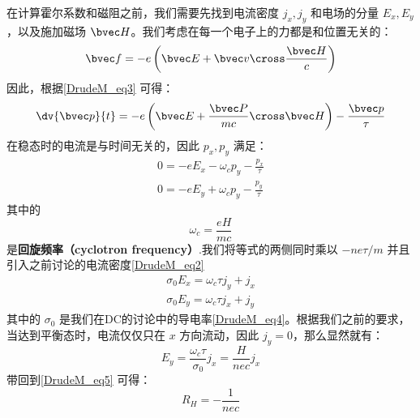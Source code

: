在计算霍尔系数和磁阻之前，我们需要先找到电流密度 $j_x,j_y$ 和电场的分量 $E_x,E_y$，以及施加磁场 $\bvec H$。我们考虑在每一个电子上的力都是和位置无关的：
\begin{equation}
\bvec f = -e\left(\bvec E +\bvec v\cross \frac{\bvec H}{c}\right)
\end{equation}
因此，根据\autoref{DrudeM_eq3} 可得：
\begin{equation}
\dv{\bvec p}{t}=-e\left(\bvec E +\frac{\bvec P}{mc}\cross \bvec H\right)-\frac{\bvec p}{\tau}
\end{equation}
在稳态时的电流是与时间无关的，因此 $p_x,p_y$ 满足：
\begin{align}
0=-eE_x-\omega_c p_y -\frac{p_x}{\tau}\\
0=-eE_y+\omega_c p_y -\frac{p_y}{\tau}
\end{align}
其中的
\begin{equation}
\omega_c = \frac{eH}{mc}
\end{equation}
是\textbf{回旋频率（cyclotron frequency）}.我们将等式的两侧同时乘以 $-ne\tau/m$ 并且引入之前讨论的电流密度\autoref{DrudeM_eq2} 
\begin{align}
\sigma_0 E_x = \omega_c \tau j_y+j_x\\
\sigma_0 E_y = \omega_c \tau j_x+j_y
\end{align}
其中的 $\sigma_0$ 是我们在DC的讨论中的导电率\autoref{DrudeM_eq4}。根据我们之前的要求，当达到平衡态时，电流仅仅只在 $x$ 方向流动，因此 $j_y = 0$，那么显然就有：
\begin{equation}
 E_y = \frac{\omega_c \tau }{\sigma_0}j_x=\frac{H}{nec}j_x
\end{equation}
带回到\autoref{DrudeM_eq5} 可得：
\begin{equation}
R_H=-\frac{1}{nec}
\end{equation}

